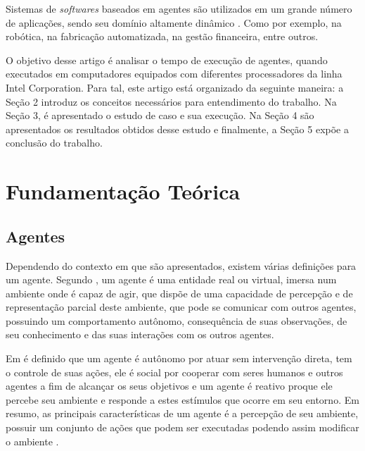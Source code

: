\documentclass[conference]{IEEEtran}
\begin{document}
    Sistemas de \textit{softwares} baseados em agentes são utilizados em um grande número de aplicações, sendo seu domínio altamente dinâmico \cite{evertsz2015using}. Como por exemplo, na robótica, na fabricação automatizada, na gestão financeira, entre outros.
        
    O objetivo desse artigo é analisar o tempo de execução de agentes, quando executados em computadores equipados com diferentes processadores da linha Intel Corporation. Para tal, este artigo está organizado da seguinte maneira: a Seção  2 introduz os conceitos necessários para entendimento do trabalho. Na Seção 3, é apresentado o estudo de caso e sua execução. Na Seção 4 são apresentados os resultados obtidos desse estudo e finalmente, a Seção 5 expõe a conclusão do trabalho.

\section{Fundamentação Teórica}

        

        \subsection{Agentes}
        Dependendo do contexto em que são apresentados, existem várias definições para um agente. Segundo \cite{ferber1991tutorial}, um agente é uma entidade real ou virtual, imersa num ambiente onde é capaz de agir, que dispõe de uma capacidade de percepção e de representação parcial deste ambiente, que pode se comunicar com outros agentes, possuindo um comportamento autônomo, consequência de suas observações, de seu conhecimento e das suas interações com os outros agentes.
        
        Em \cite{bellifemine2007developing} é definido que um agente é autônomo por atuar sem intervenção direta, tem o controle de suas ações, ele é social por cooperar com seres humanos e outros agentes a fim de alcançar os seus objetivos e um agente é reativo proque ele percebe seu ambiente e responde a estes estímulos que ocorre em seu entorno. Em resumo, as principais características de um agente é a percepção de seu ambiente, possuir um conjunto de ações que podem ser executadas podendo assim modificar o ambiente \cite{bordini2007programming}.
        
\end{document}
